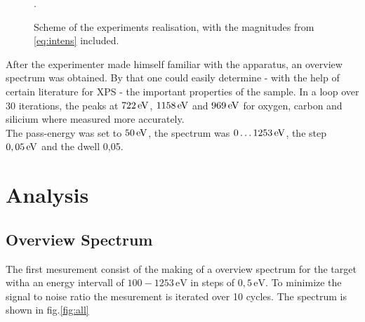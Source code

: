 \documentclass[numbers=noenddot,a4paper]{article}
\begin{document}
			\begin{figure}[h]
				\centering
				\caption{Scheme of the experiments realisation, with the magnitudes from \autoref{eq:intens} included. \cite{XPSRapha}}.
				\label{img:aufbau}
			\end{figure}

		After the experimenter made himself familiar with the apparatus, an overview spectrum was obtained. By that one could easily determine - with the help of certain literature for XPS - the important properties of the sample. In a loop over 30 iterations, the peaks at $\unit[722]{eV}$, $\unit[1158]{eV}$ and $\unit[969]{eV}$ for oxygen, carbon and silicium where measured more accurately.\\
		The pass-energy was set to $\unit[50]{eV}$, the spectrum was $\unit[0\dots1253]{eV}$, the step $\unit[0,05]{eV}$ and the dwell 0,05.

	\clearpage
	\section{Analysis}
	
	\subsection{Overview Spectrum}
	
	The first mesurement consist of the making of a overview spectrum for the target witha an energy intervall of $100 - 1253\,\mathrm{eV}$ in steps of $0,5\,\mathrm{eV}$. To minimize the signal to noise ratio the mesurement is iterated over 10 cycles. The spectrum is shown in fig.\ref{fig:all}
	
\end{document}
